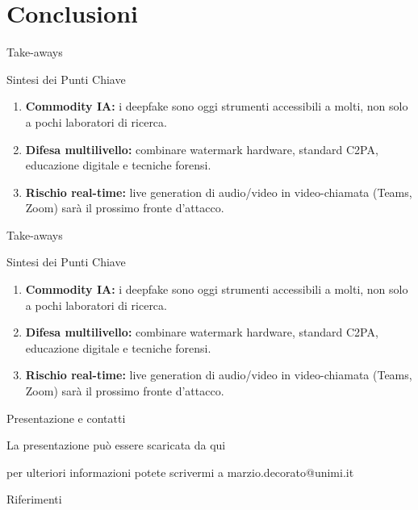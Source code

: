 \documentclass[12pt]{beamer}
\begin{document}
\section{Conclusioni}
\begin{frame}{Take-aways}
  \begin{alertblock}{Sintesi dei Punti Chiave}
    \begin{enumerate}
      \item \textbf{Commodity IA:} i deepfake sono oggi strumenti accessibili a molti, non solo a pochi laboratori di ricerca.
      \item \textbf{Difesa multilivello:} combinare watermark hardware, standard C2PA, educazione digitale e tecniche forensi.
      \item \textbf{Rischio real-time:} live generation di audio/video in video-chiamata (Teams, Zoom) sarà il prossimo fronte d’attacco.

    \end{enumerate}
  \end{alertblock}
\end{frame}


\begin{frame}{Take-aways}
  \begin{alertblock}{Sintesi dei Punti Chiave}
    \begin{enumerate}
      \item \textbf{Commodity IA:} i deepfake sono oggi strumenti accessibili a molti, non solo a pochi laboratori di ricerca.
      \item \textbf{Difesa multilivello:} combinare watermark hardware, standard C2PA, educazione digitale e tecniche forensi.
      \item \textbf{Rischio real-time:} live generation di audio/video in video-chiamata (Teams, Zoom) sarà il prossimo fronte d’attacco.

    \end{enumerate}
  \end{alertblock}
\end{frame}


\begin{frame}{Presentazione e contatti}
\begin{center}
La presentazione può essere scaricata da qui
\end{center}
\begin{center}
\end{center}
\begin{center}
per ulteriori informazioni potete scrivermi a marzio.decorato@unimi.it 
\end{center}
\end{frame}
\begin{frame}[allowframebreaks]{Riferimenti}
\printbibliography[heading=none]
\end{frame}
\end{document}
